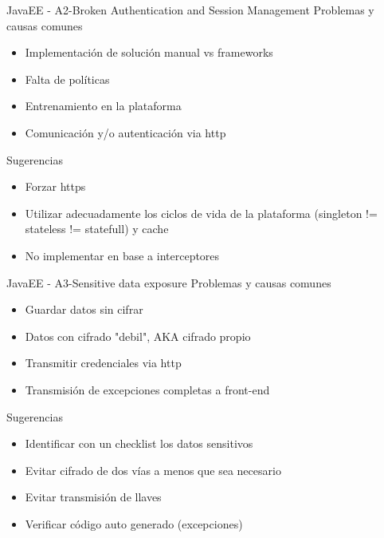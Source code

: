 \documentclass{beamer}
\begin{document}
\begin{frame}{JavaEE - A2-Broken Authentication and Session Management}
Problemas y causas comunes
\begin{itemize}
	\item Implementación de solución manual vs frameworks
	\item Falta de políticas 
	\item Entrenamiento en la plataforma
	\item Comunicación y/o autenticación via http
\end{itemize}

Sugerencias
\begin{itemize}
	\item Forzar https
	\item Utilizar adecuadamente los ciclos de vida de la plataforma (singleton != stateless != statefull) y cache
	\item No implementar en base a interceptores
\end{itemize}
\end{frame}



\begin{frame}{JavaEE - A3-Sensitive data exposure}
Problemas y causas comunes
\begin{itemize}
	\item Guardar datos sin cifrar
	\item Datos con cifrado "debil", AKA cifrado propio
	\item Transmitir credenciales via http
	\item Transmisión de excepciones completas a front-end
\end{itemize}

Sugerencias
\begin{itemize}
	\item Identificar con un checklist los datos sensitivos
	\item Evitar cifrado de dos vías a menos que sea necesario
	\item Evitar transmisión de llaves
	\item Verificar código auto generado (excepciones)
\end{itemize}
\end{frame}
\end{document}
